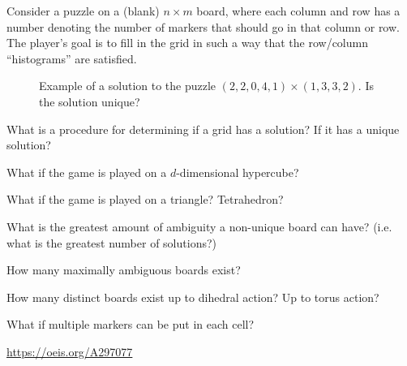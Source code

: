 \documentclass{article}
\begin{document}
  Consider a puzzle on a (blank) $n \times m$ board, where each column and row
  has a number denoting the number of markers that should go in that column or
  row. The player's goal is to fill in the grid in such a way that the
  row/column ``histograms'' are satisfied.
  \begin{figure}[!h]
    \centering
    \caption{
      Example of a solution to the puzzle $(2, 2, 0, 4, 1) \times (1, 3, 3, 2)$.
      Is the solution unique?
    }
  \end{figure}

\begin{question}
  What is a procedure for determining if a grid has a solution? If it has a
  unique solution?
\end{question}
\begin{related}
  \item What if the game is played on a $d$-dimensional hypercube?
  \item What if the game is played on a triangle? Tetrahedron?
  \item What is the greatest amount of ambiguity a non-unique board can have?
    (i.e. what is the greatest number of solutions?)
  \item How many maximally ambiguous boards exist?
  \item How many distinct boards exist up to dihedral action?
    Up to torus action?
  \item What if multiple markers can be put in each cell?
\end{related}
\begin{references}
  \item \url{https://oeis.org/A297077}
\end{references}
\end{document}
